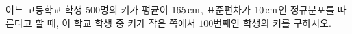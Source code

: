 어느 고등학교 학생 $500$명의 키가 평균이 $165\mkern3mu \mathrm{cm}$, 표준편차가 $10\mkern3mu \mathrm{cm}$인 정규분포를 따른다고 할 때, 이 학교 학생 중 키가 작은 쪽에서 $100$번째인 학생의 키를 구하시오. 
